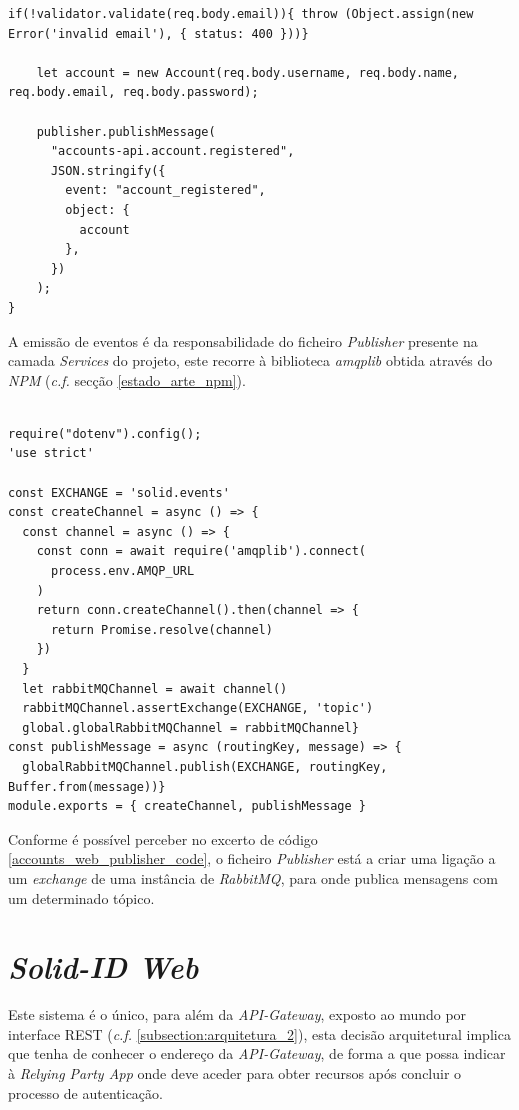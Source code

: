 \newpara
\newpara
\newpara
\newpara

\begin{lstlisting}[caption={\emph{AccountController} responsável por validar e propagar informação do utilizador}, label={accounts_web_account_controller}]
if(!validator.validate(req.body.email)){ throw (Object.assign(new Error('invalid email'), { status: 400 }))}

    let account = new Account(req.body.username, req.body.name, req.body.email, req.body.password);

    publisher.publishMessage(
      "accounts-api.account.registered",
      JSON.stringify({
        event: "account_registered",
        object: {
          account
        },
      })
    );
}
\end{lstlisting}

A emissão de eventos é da responsabilidade do ficheiro \emph{Publisher} presente na camada \emph{Services} do projeto, este recorre à biblioteca \emph{amqplib} obtida através do \emph{NPM} (\emph{c.f.} secção \ref{estado_arte_npm}).

\begin{lstlisting}[caption={\emph{Publisher} responsável por emitir os eventos para o \emph{RabbitMQ}}, label={accounts_web_publisher_code}]

require("dotenv").config();
'use strict'

const EXCHANGE = 'solid.events'
const createChannel = async () => {
  const channel = async () => {
    const conn = await require('amqplib').connect(
      process.env.AMQP_URL
    )
    return conn.createChannel().then(channel => {
      return Promise.resolve(channel)
    })
  }
  let rabbitMQChannel = await channel()
  rabbitMQChannel.assertExchange(EXCHANGE, 'topic')
  global.globalRabbitMQChannel = rabbitMQChannel}
const publishMessage = async (routingKey, message) => {
  globalRabbitMQChannel.publish(EXCHANGE, routingKey, Buffer.from(message))}
module.exports = { createChannel, publishMessage }
\end{lstlisting}

Conforme é possível perceber no excerto de código \ref{accounts_web_publisher_code}, o ficheiro \emph{Publisher} está a criar uma ligação a um \emph{exchange} de uma instância de \emph{RabbitMQ}, para onde publica mensagens com um determinado tópico.

\section{\emph{Solid-ID Web}}
Este sistema é o único, para além da \emph{API-Gateway}, exposto ao mundo por interface REST (\emph{c.f.} \ref{subsection:arquitetura_2}), esta decisão arquitetural implica que tenha de conhecer o endereço da \emph{API-Gateway}, de forma a que possa indicar à \emph{Relying Party App} onde deve aceder para obter recursos após concluir o processo de autenticação.


